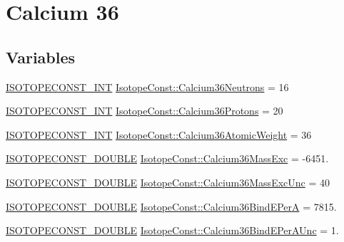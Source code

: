 \hypertarget{group___isotope_const-_calcium-_ca36}{}\section{Calcium 36}
\label{group___isotope_const-_calcium-_ca36}
\subsection*{Variables}
\begin{DoxyCompactItemize}
\item 
\mbox{\hyperlink{group___isotope_const-_macros_ga5f18360b3e99483a35c32d789e62621c}{I\+S\+O\+T\+O\+P\+E\+C\+O\+N\+S\+T\+\_\+\+I\+NT}} \mbox{\hyperlink{group___isotope_const-_calcium-_ca36_gad0b2d03d20b2c41c7a81f0060f03a88f}{Isotope\+Const\+::\+Calcium36\+Neutrons}} = 16
\item 
\mbox{\hyperlink{group___isotope_const-_macros_ga5f18360b3e99483a35c32d789e62621c}{I\+S\+O\+T\+O\+P\+E\+C\+O\+N\+S\+T\+\_\+\+I\+NT}} \mbox{\hyperlink{group___isotope_const-_calcium-_ca36_ga7dee8ef12be04bfc21b10ef9bf1f49a7}{Isotope\+Const\+::\+Calcium36\+Protons}} = 20
\item 
\mbox{\hyperlink{group___isotope_const-_macros_ga5f18360b3e99483a35c32d789e62621c}{I\+S\+O\+T\+O\+P\+E\+C\+O\+N\+S\+T\+\_\+\+I\+NT}} \mbox{\hyperlink{group___isotope_const-_calcium-_ca36_gae70529ce188105c47cb35f8f244a74b5}{Isotope\+Const\+::\+Calcium36\+Atomic\+Weight}} = 36
\item 
\mbox{\hyperlink{group___isotope_const-_macros_ga8f45a7272ce02c0b4c65c44636ed719a}{I\+S\+O\+T\+O\+P\+E\+C\+O\+N\+S\+T\+\_\+\+D\+O\+U\+B\+LE}} \mbox{\hyperlink{group___isotope_const-_calcium-_ca36_ga3648b3abe715edff677c29c034abfb52}{Isotope\+Const\+::\+Calcium36\+Mass\+Exc}} = -\/6451.
\item 
\mbox{\hyperlink{group___isotope_const-_macros_ga8f45a7272ce02c0b4c65c44636ed719a}{I\+S\+O\+T\+O\+P\+E\+C\+O\+N\+S\+T\+\_\+\+D\+O\+U\+B\+LE}} \mbox{\hyperlink{group___isotope_const-_calcium-_ca36_gaf8096a875b331b1d7355a9e9f2313a27}{Isotope\+Const\+::\+Calcium36\+Mass\+Exc\+Unc}} = 40
\item 
\mbox{\hyperlink{group___isotope_const-_macros_ga8f45a7272ce02c0b4c65c44636ed719a}{I\+S\+O\+T\+O\+P\+E\+C\+O\+N\+S\+T\+\_\+\+D\+O\+U\+B\+LE}} \mbox{\hyperlink{group___isotope_const-_calcium-_ca36_gade22f16757b42129a3df62d1aca727d4}{Isotope\+Const\+::\+Calcium36\+Bind\+E\+PerA}} = 7815.
\item 
\mbox{\hyperlink{group___isotope_const-_macros_ga8f45a7272ce02c0b4c65c44636ed719a}{I\+S\+O\+T\+O\+P\+E\+C\+O\+N\+S\+T\+\_\+\+D\+O\+U\+B\+LE}} \mbox{\hyperlink{group___isotope_const-_calcium-_ca36_ga393780d134731e48e60761aec0e41ddc}{Isotope\+Const\+::\+Calcium36\+Bind\+E\+Per\+A\+Unc}} = 1.

\end{DoxyCompactItemize}
